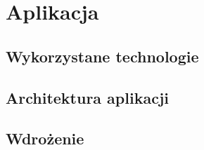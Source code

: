 \chapter{Aplikacja}

\section{Wykorzystane technologie}

\section{Architektura aplikacji}

\section{Wdrożenie}